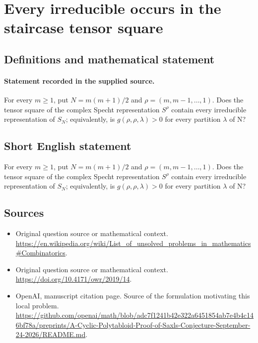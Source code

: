 \documentclass[11pt]{article}
\begin{document}
\section*{Every irreducible occurs in the staircase tensor square}\label{statement}
\subsection{Definitions and mathematical statement}
\paragraph{Statement recorded in the supplied source.}
For every $m\geq 1$, put $N=m(m+1)/2$ and $\rho =(m,m-1,\dots ,1)$. Does the tensor square of the complex Specht representation $S^\rho $ contain every irreducible representation of $S_N$; equivalently, is $g(\rho ,\rho ,\lambda )>0$ for every partition $\lambda $ of N?
\subsection{Short English statement}
For every $m\geq 1$, put $N=m(m+1)/2$ and $\rho =(m,m-1,\dots ,1)$. Does the tensor square of the complex Specht representation $S^\rho $ contain every irreducible representation of $S_N$; equivalently, is $g(\rho ,\rho ,\lambda )>0$ for every partition $\lambda $ of N?
\subsection{Sources}
\begin{itemize}
\item[S1] Original question source or mathematical context.
\url{https://en.wikipedia.org/wiki/List_of_unsolved_problems_in_mathematics#Combinatorics}.
\item[S2] Original question source or mathematical context.
\url{https://doi.org/10.4171/owr/2019/14}.
\item[S3] OpenAI, manuscript citation page. Source of the formulation motivating this local problem.
\url{https://github.com/openai/math/blob/adc7f1241b42e322a6451854ab7e4b4c146bf78a/preprints/A-Cyclic-Polytabloid-Proof-of-Saxls-Conjecture-September-24-2026/README.md}.
\end{itemize}
\end{document}
